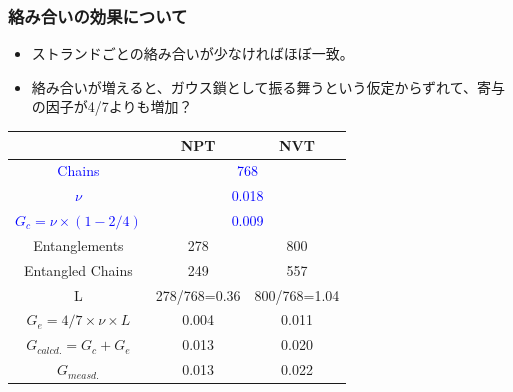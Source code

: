 \documentclass[12pt, dvipdfmx]{beamer}
\begin{document}
\begin{frame}
    \frametitle{絡み合いの効果について}
    \vspace{-3mm}
            \small
                \begin{itemize}
                    \item ストランドごとの絡み合いが少なければほぼ一致。
                    \item 絡み合いが増えると、ガウス鎖として振る舞うという仮定からずれて、寄与の因子が4/7よりも増加？
                \end{itemize}

                \begin{center}
                    \begin{tabular}{c|c|c} \hline
                        &NPT & NVT \\ \hline \hline
                        \textcolor{blue}{Chains} & \multicolumn{2}{|c}{\textcolor{blue}{768}}\\ \hline
                        \textcolor{blue}{$\nu$}& \multicolumn{2}{|c}{\textcolor{blue}{0.018}}\\ \hline
                        \textcolor{blue}{$G_c = \nu \times (1-2/4)$}&\multicolumn{2}{|c}{\textcolor{blue}{0.009}} \\ \hline \hline
                        Entanglements& 278& 800\\ \hline
                        Entangled Chains&249&557 \\ \hline
                        L & 278/768=0.36 & 800/768=1.04 \\ \hline
                        $G_e=4/7 \times \nu \times L $ & 0.004 & 0.011 \\ \hline \hline
                        $G_{calcd.}=G_c + G_e$ & 0.013 & 0.020 \\ \hline \hline
                        $G_{measd.}$ & 0.013 & 0.022 \\ \hline
                    \end{tabular}
                \end{center}
                

\end{frame}
\end{document}
